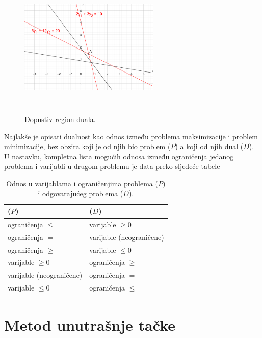 \documentclass[a4paper, utf8, 11pt, colorlinks]{book}
\begin{document}
\begin{figure}[H]
    \centering
    \includegraphics[width=190pt, height=190pt]{fig6.eps}
    \caption{Dopustiv region duala.}
    \label{fig:fig6-dual-region}
\end{figure}

Najlakše je opisati dualnost kao odnos između problema maksimizacije i problem minimizacije, bez obzira koji je od njih bio problem ($P$) a koji od njih  dual ($D$). 
U nastavku, kompletna lista mogućih odnosa između ograničenja
jedanog problema i varijabli u drugom problemu je data preko sljedeće tabele
\begin{table}[!ht]
	\centering
    \begin{tabular}{l|l}
      ($P$) & ($D$) \\ \hline
      ograničenja $\leq$  & varijable $\geq 0$ \\
      ograničenja $=$     & varijable (neograničene) \\
      ograničenja $\geq$  & varijable $\leq 0$ \\
      varijable $\geq 0$    & ograničenja $\geq$ \\
      varijable (neograničene) & ograničenja $=$ \\
      varijable $\leq 0$         & ograničenja $\leq$ \\ \hline
    \end{tabular}
  
    \caption{Odnos u varijablama i ograničenjima problema ($P$) i odgovarajućeg problema ($D$).}  \label{tab:primal-dual-relation}
\end{table}


\section{Metod unutrašnje tačke}
\end{document}

